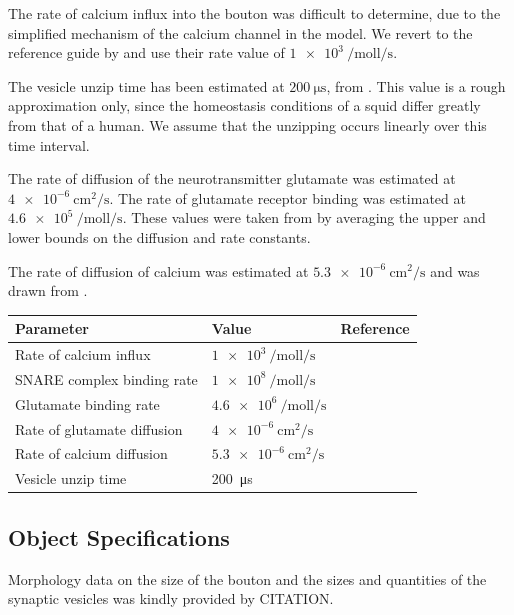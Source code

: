 \documentclass[a4paper]{article}
\begin{document}
The rate of calcium influx into the bouton was difficult to determine, due to the simplified mechanism of the calcium channel in the model. We revert to the reference guide by \cite{Czech:MethodsMolBiol:2009} and use their rate value of $\SI{1e3}{\per\mole\litre\per\second}$.

The vesicle unzip time has been estimated at $\SI{200}{\micro\second}$, from \cite{Llinas:TheSquidGiantSynapseAModel:1999}. This value is a rough approximation only, since the homeostasis conditions of a squid differ greatly from that of a human. We assume that the unzipping occurs linearly over this time interval.

The rate of diffusion of the neurotransmitter glutamate was estimated at $\SI{4e-6}{\centi\metre\squared\per\second}$. The rate of glutamate receptor binding was estimated at $\SI{4.6e5}{\per\mol\litre\per\second}$. These values were taken from \cite{rusakov2001role} by averaging the upper and lower bounds on the diffusion and rate constants.

The rate of diffusion of calcium was estimated at $\SI{5.3e-6}{\centi\metre\squared\per\second}$ and was drawn from \cite{Dittrich:BiophysJ:2013}.
\begin{table}[H]
\begin{tabular}{lll}
Parameter & Value & Reference \\ \hline
Rate of calcium influx   &  $\SI{1e3}{\per\mole\litre\per\second}$      &    \cite{Czech:MethodsMolBiol:2009} \\
SNARE complex binding rate & $\SI{1e8}{\per\mol\litre\per\second}$ & \cite{ma2014quantitative}\\
Glutamate binding rate & $\SI{4.6e6}{\per\mol\litre\per\second}$ & \cite{rusakov2001role} \\
Rate of glutamate diffusion & $\SI{4e-6}{\centi\metre\squared\per\second} $      &\cite{rusakov2001role} \\
Rate of calcium diffusion & $\SI{5.3e-6}{\centi\metre\squared\per\second} $      &\cite{Dittrich:BiophysJ:2013} \\
Vesicle unzip time & \SI{200}{\micro\second} & \cite{Llinas:TheSquidGiantSynapseAModel:1999}\\
\end{tabular}
\end{table}

\subsection{Object Specifications}
Morphology data on the size of the bouton and the sizes and quantities of the synaptic vesicles was kindly provided by CITATION. 
\end{document}
